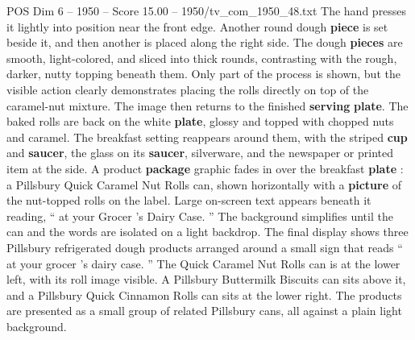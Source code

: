 \begin{textsample}{POS Dim 6 – 1950 – Score 15.00 – 1950/tv\_com\_1950\_48.txt}
The hand presses it lightly into position near the front edge.
Another round dough \textbf{piece} is set beside it, and then another is placed along the right side.
The dough \textbf{pieces} are smooth, light-colored, and sliced into thick rounds, contrasting with the rough, darker, nutty topping beneath them.
Only part of the process is shown, but the visible action clearly demonstrates placing the rolls directly on top of the caramel-nut mixture.
The image then returns to the finished \textbf{serving} \textbf{plate}.
The baked rolls are back on the white \textbf{plate}, glossy and topped with chopped nuts and caramel.
The breakfast setting reappears around them, with the striped \textbf{cup} and \textbf{saucer}, the glass on its \textbf{saucer}, silverware, and the newspaper or printed item at the side.
A product \textbf{package} graphic fades in over the breakfast \textbf{plate} : a Pillsbury Quick Caramel Nut Rolls can, shown horizontally with a \textbf{picture} of the nut-topped rolls on the label.
Large on-screen text appears beneath it reading, “ at your Grocer ’s Dairy Case. ” The background simplifies until the can and the words are isolated on a light backdrop.
The final display shows three Pillsbury refrigerated dough products arranged around a small sign that reads “ at your grocer ’s dairy case. ” The Quick Caramel Nut Rolls can is at the lower left, with its roll image visible.
A Pillsbury Buttermilk Biscuits can sits above it, and a Pillsbury Quick Cinnamon Rolls can sits at the lower right.
The products are presented as a small group of related Pillsbury cans, all against a plain light background.

\end{textsample}

